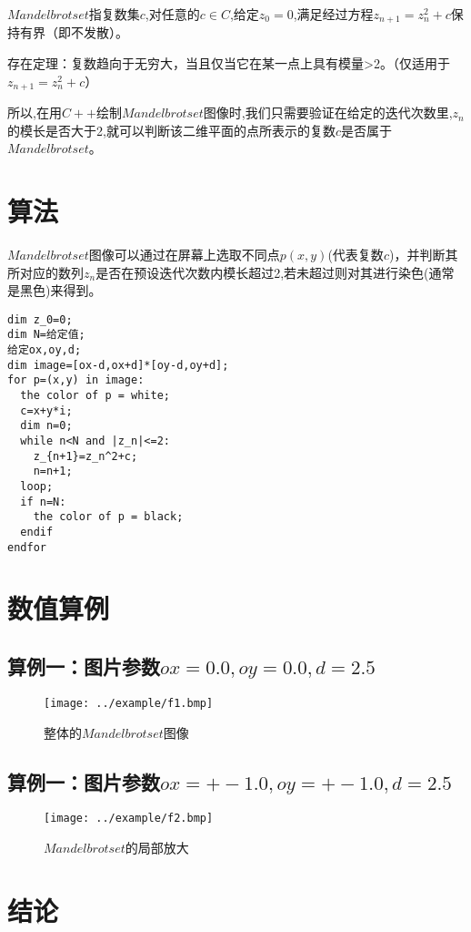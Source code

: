\documentclass{ctexart}
\begin{document}
$Mandelbrot set$指复数集${c}$,对任意的$c\in C$,给定$z_0=0$,满足经过方程$z_{n+1}=z_n^2+c$保持有界（即不发散）。\par

存在定理：复数趋向于无穷大，当且仅当它在某一点上具有模量>2。（仅适用于$z_{n+1}=z_n^2+c$）\par

所以,在用$C++$绘制$Mandelbrot set$图像时,我们只需要验证在给定的迭代次数里,$z_n$的模长是否大于2,就可以判断该二维平面的点所表示的复数$c$是否属于$Mandelbrot set$。\par

\section{算法}

$Mandelbrot set$图像可以通过在屏幕上选取不同点$p(x,y)$(代表复数$c$)，并判断其所对应的数列${z_n}$是否在预设迭代次数内模长超过2,若未超过则对其进行染色(通常是黑色)来得到。

\begin{verbatim}
dim z_0=0;
dim N=给定值;
给定ox,oy,d;
dim image=[ox-d,ox+d]*[oy-d,oy+d];
for p=(x,y) in image:
  the color of p = white;
  c=x+y*i;
  dim n=0;
  while n<N and |z_n|<=2:
    z_{n+1}=z_n^2+c;
    n=n+1;
  loop;
  if n=N:
    the color of p = black;
  endif
endfor
\end{verbatim}

\section{数值算例}
\subsection{算例一：图片参数$ox=0.0,oy=0.0,d=2.5$}

\begin{figure}[h]
  \centering
  \texttt{[image: ../example/f1.bmp]}
  \caption{整体的$Mandelbrot set$图像}
  \label{g::01}
\end{figure}

\subsection{算例一：图片参数$ox=+-1.0,oy=+-1.0,d=2.5$}

\begin{figure}[h]
  \centering
  \texttt{[image: ../example/f2.bmp]}
  \caption{$Mandelbrot set$的局部放大}
  \label{g::02}
\end{figure}

\section{结论}
\end{document}

